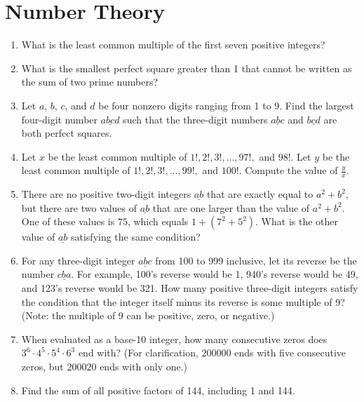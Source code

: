 \documentclass[11pt]{article}
\begin{document}
	\section{Number Theory}
		\begin{enumerate}[1.]
			\item What is the least common multiple of the first seven positive integers?
			
			\item What is the smallest perfect square greater than 1 that cannot be written as the sum of two prime numbers?
			
			\item Let $a$, $b$, $c$, and $d$ be four nonzero digits ranging from 1 to 9. Find the largest four-digit number $\underline{abcd}$ such that the three-digit numbers $\underline{abc}$ and $\underline{bcd}$ are both perfect squares.
			
			\item Let $x$ be the least common multiple of $1!, 2!, 3!, \ldots, 97!,$ and $98!$. Let $y$ be the least common multiple of $1!, 2!, 3!, \ldots, 99!,$ and $100!$. Compute the value of $\frac{y}{x}$.
			
			\item There are no positive two-digit integers $\underline{ab}$ that are exactly equal to $a^2 + b^2$, but there are two values of $\underline{ab}$ that are one larger than the value of $a^2 + b^2$. One of these values is $75$, which equals $1 + \left(7^2 + 5^2\right)$. What is the other value of $\underline{ab}$ satisfying the same condition?
			
			\item For any three-digit integer $\underline{abc}$ from 100 to 999 inclusive, let its reverse be the number $\underline{cba}$. For example, 100's reverse would be 1, 940's reverse would be 49, and 123's reverse would be 321. How many positive three-digit integers satisfy the condition that the integer itself minus its reverse is some multiple of 9? (Note: the multiple of 9 can be positive, zero, or negative.)
			
			\item When evaluated as a base-10 integer, how many consecutive zeros does $3^6\cdot4^5\cdot5^4\cdot6^3$ end with? (For clarification, $200000$ ends with five consecutive zeros, but $200020$ ends with only one.)
			
			\item Find the sum of all positive factors of 144, including 1 and 144.
			

\end{enumerate}
\end{document}
